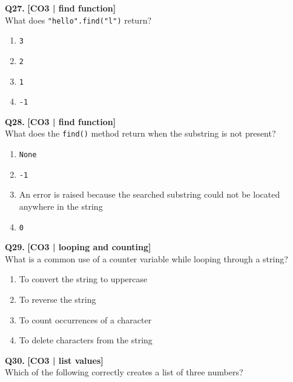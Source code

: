 \noindent\textbf{Q27.} \hfill {\small\color{LPUOrange}\textbf{[CO3 | find function]}}\\[2pt]
What does \texttt{"hello".find("l")} return?

\begin{enumerate}[label=(\alph*),topsep=2pt,itemsep=1pt,partopsep=0pt,parsep=0pt]
    \item \relax \texttt{3}
    \item \relax \texttt{2}
    \item \relax \texttt{1}
    \item \relax \texttt{-1}
\end{enumerate}
\vspace{{2mm}}

\noindent\textbf{Q28.} \hfill {\small\color{LPUOrange}\textbf{[CO3 | find function]}}\\[2pt]
What does the \texttt{find()} method return when the substring is not present?

\begin{enumerate}[label=(\alph*),topsep=2pt,itemsep=1pt,partopsep=0pt,parsep=0pt]
    \item \relax \texttt{None}
    \item \relax \texttt{-1}
    \item \relax An error is raised because the searched substring could not be located anywhere in the string
    \item \relax \texttt{0}
\end{enumerate}
\vspace{{2mm}}

\noindent\textbf{Q29.} \hfill {\small\color{LPUOrange}\textbf{[CO3 | looping and counting]}}\\[2pt]
What is a common use of a counter variable while looping through a string?

\begin{enumerate}[label=(\alph*),topsep=2pt,itemsep=1pt,partopsep=0pt,parsep=0pt]
    \item \relax To convert the string to uppercase
    \item \relax To reverse the string
    \item \relax To count occurrences of a character
    \item \relax To delete characters from the string
\end{enumerate}
\vspace{{2mm}}

\noindent\textbf{Q30.} \hfill {\small\color{LPUOrange}\textbf{[CO3 | list values]}}\\[2pt]
Which of the following correctly creates a list of three numbers?

